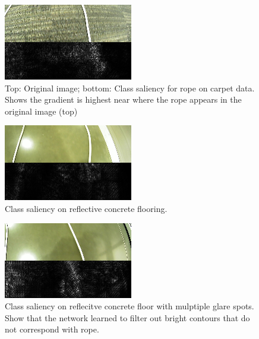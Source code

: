 \begin{figure}[hbt]
  \includegraphics[width=\columnwidth]{figures/saliency1}
  \caption{Top: Original image; bottom: Class saliency for rope on carpet data. Shows the gradient is highest near where the rope appears in the original image (top)}
  \label{fig:saliency1}
\end{figure}

\begin{figure}[hbt]
  \includegraphics[width=\columnwidth]{figures/saliency2}
  \caption{Class saliency on reflective concrete flooring.}
  \label{fig:saliency2}
\end{figure}

\begin{figure}[hbt]
  \includegraphics[width=\columnwidth]{figures/saliency3}
  \caption{Class saliency on reflecitve concrete floor with mulptiple glare spots. Show that the network learned to filter out bright contours that do not correspond with rope.}
  \label{fig:saliency3}
\end{figure}
